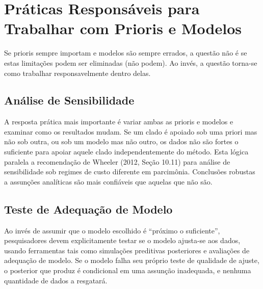 \section{Práticas Responsáveis para Trabalhar com Prioris e Modelos}

Se prioris sempre importam e modelos são sempre errados, a questão não é se estas limitações podem ser eliminadas (não podem). Ao invés, a questão torna-se como trabalhar responsavelmente dentro delas.

\subsection{Análise de Sensibilidade}

A resposta prática mais importante é variar ambas as prioris e modelos e examinar como os resultados mudam. Se um clado é apoiado sob uma priori mas não sob outra, ou sob um modelo mas não outro, os dados não são fortes o suficiente para apoiar aquele clado independentemente do método. Esta lógica paralela a recomendação de Wheeler (2012, Seção 10.11) para análise de sensibilidade sob regimes de custo diferente em parcimônia. Conclusões robustas a assunções analíticas são mais confiáveis que aquelas que não são.

\subsection{Teste de Adequação de Modelo}

Ao invés de assumir que o modelo escolhido é ``próximo o suficiente'', pesquisadores devem explicitamente testar se o modelo ajusta-se aos dados, usando ferramentas tais como simulações preditivas posteriores e avaliações de adequação de modelo. Se o modelo falha seu próprio teste de qualidade de ajuste, o posterior que produz é condicional em uma assunção inadequada, e nenhuma quantidade de dados a resgatará.

